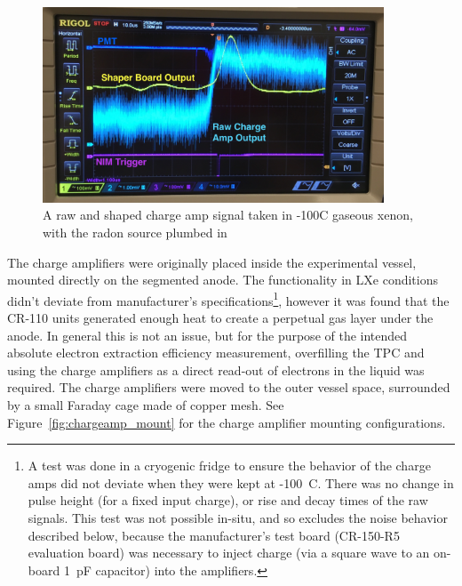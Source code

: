 \begin{figure}[htbp]
\begin{center}
\includegraphics[width=4in]{figures/testbed/charge_amp_shaper.jpg}
\caption{A raw and shaped charge amp signal taken in -100C gaseous xenon, with the radon source plumbed in}
\label{fig:shaper}
\end{center}
\end{figure}

The charge amplifiers were originally placed inside the experimental vessel, mounted directly on the segmented anode. The functionality in \ac{LXe} conditions didn't deviate from manufacturer's specifications\footnote{A test was done in a cryogenic fridge to ensure the behavior of the charge amps did not deviate when they were kept at -100~C. There was no change in pulse height (for a fixed input charge), or rise and decay times of the raw signals. This test was not possible in-situ, and so excludes the noise behavior described below, because the manufacturer's test board (CR-150-R5 evaluation board) was necessary to inject charge (via a square wave to an on-board 1~pF capacitor) into the amplifiers.}, however it was found that the CR-110 units generated enough heat to create a perpetual gas layer under the anode. In general this is not an issue, but for the purpose of the intended absolute electron extraction efficiency measurement, overfilling the \ac{TPC} and using the charge amplifiers as a direct read-out of electrons in the liquid was required. The charge amplifiers were moved to the outer vessel space, surrounded by a small Faraday cage made of copper mesh. See Figure~\ref{fig:chargeamp_mount} for the charge amplifier mounting configurations.


